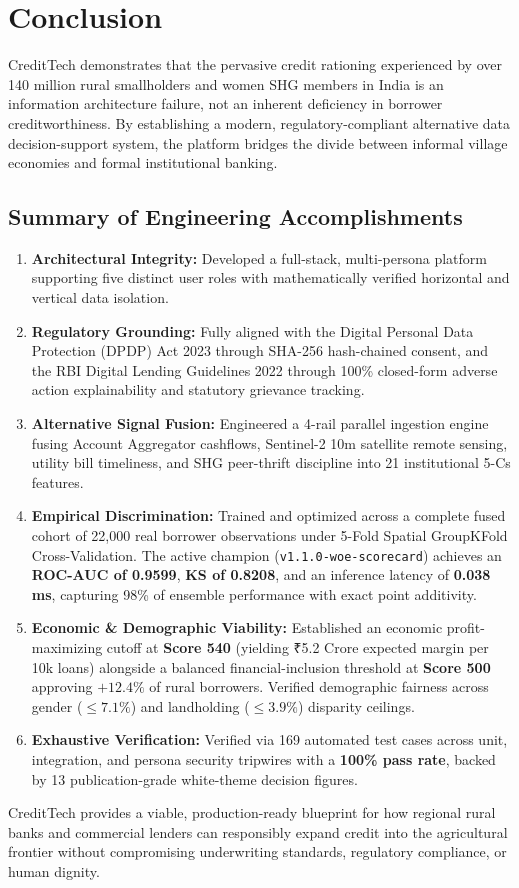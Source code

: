 \chapter{Conclusion}
\label{chap:conclusion}

CreditTech demonstrates that the pervasive credit rationing experienced by over 140 million rural smallholders and women SHG members in India is an information architecture failure, not an inherent deficiency in borrower creditworthiness. By establishing a modern, regulatory-compliant alternative data decision-support system, the platform bridges the divide between informal village economies and formal institutional banking.

\section{Summary of Engineering Accomplishments}
\begin{enumerate}
  \item \textbf{Architectural Integrity:} Developed a full-stack, multi-persona platform supporting five distinct user roles with mathematically verified horizontal and vertical data isolation.
  \item \textbf{Regulatory Grounding:} Fully aligned with the Digital Personal Data Protection (DPDP) Act 2023 through SHA-256 hash-chained consent, and the RBI Digital Lending Guidelines 2022 through 100\% closed-form adverse action explainability and statutory grievance tracking.
  \item \textbf{Alternative Signal Fusion:} Engineered a 4-rail parallel ingestion engine fusing Account Aggregator cashflows, Sentinel-2 10m satellite remote sensing, utility bill timeliness, and SHG peer-thrift discipline into 21 institutional 5-Cs features.
  \item \textbf{Empirical Discrimination:} Trained and optimized across a complete fused cohort of 22,000 real borrower observations under 5-Fold Spatial GroupKFold Cross-Validation. The active champion (\texttt{v1.1.0-woe-scorecard}) achieves an \textbf{ROC-AUC of 0.9599}, \textbf{KS of 0.8208}, and an inference latency of \textbf{0.038\,ms}, capturing 98\% of ensemble performance with exact point additivity.
  \item \textbf{Economic \& Demographic Viability:} Established an economic profit-maximizing cutoff at \textbf{Score 540} (yielding ₹5.2 Crore expected margin per 10k loans) alongside a balanced financial-inclusion threshold at \textbf{Score 500} approving $+12.4\%$ of rural borrowers. Verified demographic fairness across gender ($\le 7.1\%$) and landholding ($\le 3.9\%$) disparity ceilings.
  \item \textbf{Exhaustive Verification:} Verified via 169 automated test cases across unit, integration, and persona security tripwires with a \textbf{100\% pass rate}, backed by 13 publication-grade white-theme decision figures.
\end{enumerate}

CreditTech provides a viable, production-ready blueprint for how regional rural banks and commercial lenders can responsibly expand credit into the agricultural frontier without compromising underwriting standards, regulatory compliance, or human dignity.
